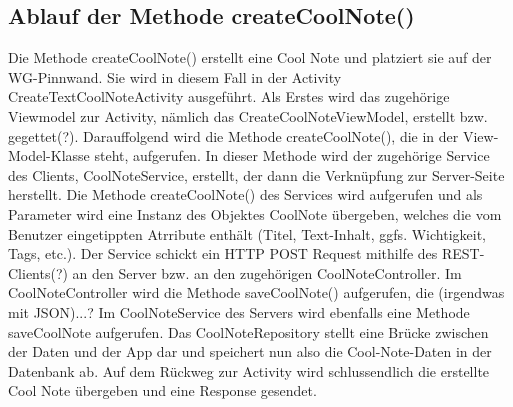 \subsection{Ablauf der Methode createCoolNote()}

Die Methode createCoolNote() erstellt eine Cool Note und platziert sie auf der WG-Pinnwand. Sie wird in diesem Fall in der Activity CreateTextCoolNoteActivity ausgeführt. Als Erstes wird das zugehörige Viewmodel zur Activity, nämlich das CreateCoolNoteViewModel, erstellt bzw. gegettet(?). Darauffolgend wird die Methode createCoolNote(), die in der View-Model-Klasse steht, aufgerufen. In dieser Methode wird der zugehörige Service des Clients, CoolNoteService, erstellt, der dann die Verknüpfung zur Server-Seite herstellt. Die Methode createCoolNote() des Services wird aufgerufen und als Parameter wird eine Instanz des Objektes CoolNote übergeben, welches die vom Benutzer eingetippten Atrribute enthält (Titel, Text-Inhalt, ggfs. Wichtigkeit, Tags, etc.). Der Service schickt ein HTTP POST Request mithilfe des REST-Clients(?) an den Server bzw. an den zugehörigen CoolNoteController. Im CoolNoteController wird die Methode saveCoolNote() aufgerufen, die (irgendwas mit JSON)...? Im CoolNoteService des Servers wird ebenfalls eine Methode saveCoolNote aufgerufen. Das CoolNoteRepository stellt eine Brücke zwischen der Daten und der App dar und speichert nun also die Cool-Note-Daten in der Datenbank ab. Auf dem Rückweg zur Activity wird schlussendlich die erstellte Cool Note übergeben und eine Response gesendet.